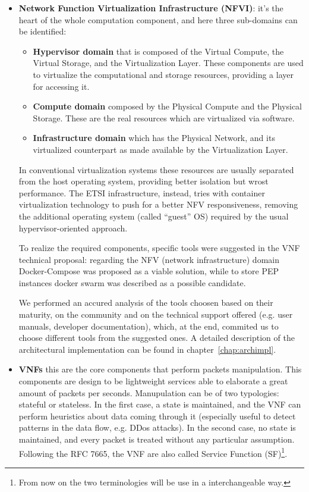 \documentclass[10pt]{book}
\begin{document}
\begin{itemize}
 \item \textbf{Network Function Virtualization Infrastructure (NFVI)}: it's the
   heart of the whole computation component, and here three sub-domains can be
   identified: 
\begin{itemize} 
 \item \textbf{Hypervisor domain} that is composed of the Virtual Compute, the
   Virtual Storage, and the Virtualization Layer. These components are used to
   virtualize the computational and storage resources, providing a layer for
   accessing it.
 \item \textbf{Compute domain} composed by the Physical Compute and the Physical
   Storage. These are the real resources which are virtualized via software.
 \item \textbf{Infrastructure domain} which has the Physical Network, and its
   virtualized counterpart as made available by the Virtualization Layer.
\end{itemize}

In conventional virtualization systems these resources are usually separated
from the host operating system, providing better isolation but wrost
performance. The ETSI infrastructure, instead, tries with container
virtualization technology to push for a better NFV responsiveness, removing the additional operating
system (called ``guest'' OS) required by the usual hypervisor-oriented approach.

To realize the required components, specific tools were suggested in the VNF
technical proposal: regarding the NFV (network infrastructure) domain
Docker-Compose was proposed as a viable solution, while to store PEP instances
docker swarm was described as a possible candidate.

We performed an accured analysis of the tools choosen based on their maturity,
on the community and on the technical support offered (e.g. user manuals,
developer documentation), which, at the end, commited us to choose different
tools from the suggested ones. A detailed description of the architectural
implementation can be found in chapter~\ref{chap:archimpl}.

\item \textbf{VNFs} this are the core components that perform packets
  manipulation. This components are design to be lightweight services able to
  elaborate a great amount of packets per seconds. Manupulation can be of two
  typologies: stateful or stateless. In the first case, a state is maintained,
  and the VNF can perform heuristics about data coming through it (especially
  useful to detect patterns in the data flow, e.g. DDos attacks). In the second
  case, no state is maintained, and every packet is treated without any
  particular assumption. Following the RFC 7665, the VNF are also called Service
  Function (SF)\footnote{From now on the two terminologies will be use in a
    interchangeable way.}. 


\end{itemize}
\end{document}
